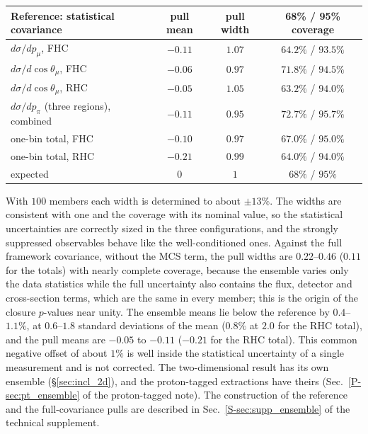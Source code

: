 \documentclass[11pt,a4paper]{article}
\newcommand{\suppref}[2]{#1~\ref{S-#2} of the technical supplement}
\newcommand{\ptref}[2]{#1~\ref{P-#2} of the proton-tagged note}
\begin{document}
\begin{center}
\small
\begin{tabular}{lccc}
\toprule
Reference: statistical covariance & pull mean & pull width & 68\% / 95\% coverage \\
\midrule
$d\sigma/dp_\mu$, FHC                    & $-0.11$ & $1.07$ & $64.2\%$ / $93.5\%$ \\
$d\sigma/d\cos\theta_\mu$, FHC           & $-0.06$ & $0.97$ & $71.8\%$ / $94.5\%$ \\
$d\sigma/d\cos\theta_\mu$, RHC           & $-0.05$ & $1.05$ & $63.2\%$ / $94.0\%$ \\
$d\sigma/dp_\pi$ (three regions), combined & $-0.11$ & $0.95$ & $72.7\%$ / $95.7\%$ \\
one-bin total, FHC                       & $-0.10$ & $0.97$ & $67.0\%$ / $95.0\%$ \\
one-bin total, RHC                       & $-0.21$ & $0.99$ & $64.0\%$ / $94.0\%$ \\
\midrule
expected                & $0$     & $1$    & $68\%$ / $95\%$ \\
\bottomrule
\end{tabular}
\end{center}

With $100$ members each width is determined to about $\pm13\%$. The widths are consistent with one
and the coverage with its nominal value, so the statistical uncertainties are correctly sized in the
three configurations, and the strongly suppressed observables behave like the well-conditioned
ones. Against the full framework covariance, without the MCS term, the pull widths are $0.22$--$0.46$ ($0.11$ for the totals) with
nearly complete coverage, because the ensemble varies only the data statistics while the full
uncertainty also contains the flux, detector and cross-section terms, which are the same in every
member; this is the origin of the closure $p$-values near unity. The ensemble means lie below the
reference by $0.4$--$1.1\%$, at $0.6$--$1.8$ standard deviations of the mean ($0.8\%$ at $2.0$ for
the RHC total), and the pull means are $-0.05$ to $-0.11$ ($-0.21$ for the RHC total). This
common negative offset of about $1\%$ is well inside the statistical uncertainty of a single
measurement and is not corrected. The two-dimensional result has its own ensemble
(\S\ref{sec:incl_2d}), and the proton-tagged extractions have theirs (\ptref{Sec.}{sec:pt_ensemble}). The construction of the reference and the full-covariance pulls are described in
\suppref{Sec.}{sec:supp_ensemble}.
\end{document}

